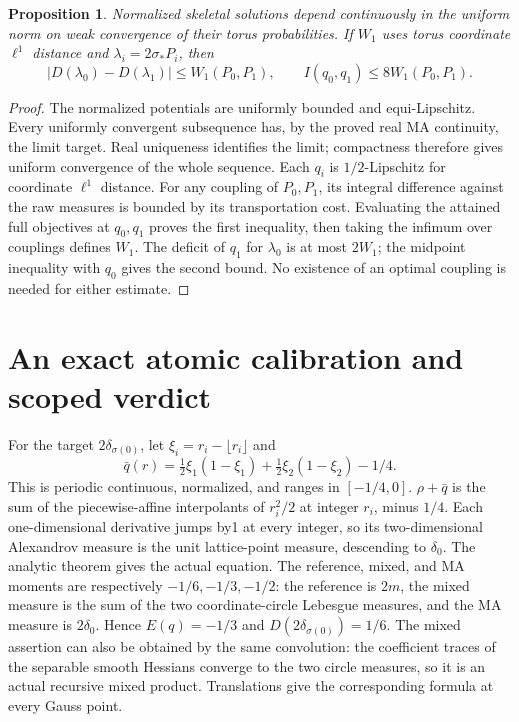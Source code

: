 \documentclass[11pt]{article}
\newtheorem{proposition}[theorem]{Proposition}
\begin{document}
\begin{proposition}\label{newrad:stability}
Normalized skeletal solutions depend continuously in the uniform norm
on weak convergence of their torus probabilities. If $W_1$ uses torus
coordinate $\ell^1$ distance and $\lambda_i=2\sigma_*P_i$, then
\[
 |D(\lambda_0)-D(\lambda_1)|\le W_1(P_0,P_1),\qquad
 I(q_0,q_1)\le8W_1(P_0,P_1).
\]
\end{proposition}
\begin{proof}
The normalized potentials are uniformly bounded and equi-Lipschitz.
Every uniformly convergent subsequence has, by the proved real MA
continuity, the limit target. Real uniqueness identifies the limit;
compactness therefore gives uniform convergence of the whole sequence.
Each $q_i$ is $1/2$-Lipschitz for coordinate $\ell^1$ distance.
For any coupling of $P_0,P_1$, its integral difference against the
raw measures is bounded by its transportation cost. Evaluating the
attained full objectives at $q_0,q_1$ proves the first inequality,
then taking the infimum over couplings defines $W_1$. The deficit of
$q_1$ for $\lambda_0$ is at most $2W_1$; the midpoint inequality
with $q_0$ gives the second bound. No existence of an optimal coupling
is needed for either estimate.
\end{proof}

\section{An exact atomic calibration and scoped verdict}
For the target $2\delta_{\sigma(0)}$, let
$\xi_i=r_i-\lfloor r_i\rfloor$ and
\[
 \bar q(r)=\tfrac12\xi_1(1-\xi_1)
             +\tfrac12\xi_2(1-\xi_2)-1/4.
\]
This is periodic continuous, normalized, and ranges in $[-1/4,0]$.
$\rho+\bar q$ is the sum of the piecewise-affine interpolants of
$r_i^2/2$ at integer $r_i$, minus $1/4$. Each one-dimensional
derivative jumps by1 at every integer, so its two-dimensional
Alexandrov measure is the unit lattice-point measure, descending to
$\delta_0$. The analytic theorem gives the actual equation.
The reference, mixed, and MA moments are respectively $-1/6,-1/3,-1/2$:
the reference is $2m$, the mixed measure is the sum of the two
coordinate-circle Lebesgue measures, and the MA measure is $2\delta_0$.
Hence $E(q)=-1/3$ and $D(2\delta_{\sigma(0)})=1/6$.
The mixed assertion can also be obtained by the same convolution:
the coefficient traces of the separable smooth Hessians converge to
the two circle measures, so it is an actual recursive mixed product.
Translations give the corresponding formula at every Gauss point.
\end{document}
